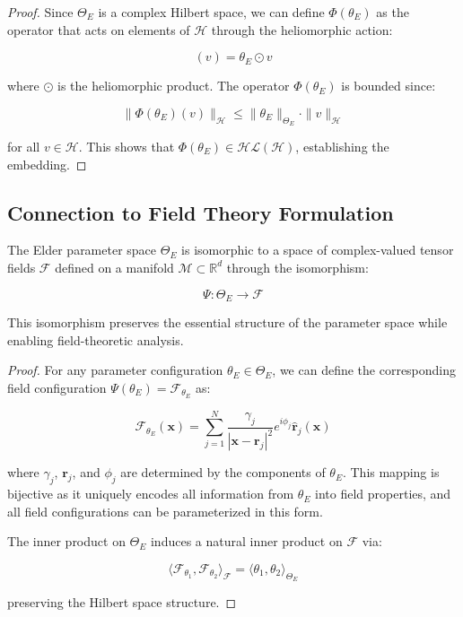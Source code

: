\begin{proof}
Since $\Theta_E$ is a complex Hilbert space, we can define $\Phi(\theta_E)$ as the operator that acts on elements of $\mathcal{H}$ through the heliomorphic action:

\begin{equation}
[\Phi(\theta_E)](v) = \theta_E \odot v
\end{equation}

where $\odot$ is the heliomorphic product. The operator $\Phi(\theta_E)$ is bounded since:

\begin{equation}
\|\Phi(\theta_E)(v)\|_{\mathcal{H}} \leq \|\theta_E\|_{\Theta_E} \cdot \|v\|_{\mathcal{H}}
\end{equation}

for all $v \in \mathcal{H}$. This shows that $\Phi(\theta_E) \in \mathcal{HL}(\mathcal{H})$, establishing the embedding.
\end{proof}

\subsection{Connection to Field Theory Formulation}

\begin{theorem}
The Elder parameter space $\Theta_E$ is isomorphic to a space of complex-valued tensor fields $\mathcal{F}$ defined on a manifold $\mathcal{M} \subset \mathbb{R}^d$ through the isomorphism:

\begin{equation}
\Psi: \Theta_E \to \mathcal{F}
\end{equation}

This isomorphism preserves the essential structure of the parameter space while enabling field-theoretic analysis.
\end{theorem}

\begin{proof}
For any parameter configuration $\theta_E \in \Theta_E$, we can define the corresponding field configuration $\Psi(\theta_E) = \mathcal{F}_{\theta_E}$ as:

\begin{equation}
\mathcal{F}_{\theta_E}(\mathbf{x}) = \sum_{j=1}^N \frac{\gamma_j}{|\mathbf{x} - \mathbf{r}_j|^2} e^{i\phi_j} \hat{\mathbf{r}}_j(\mathbf{x})
\end{equation}

where $\gamma_j$, $\mathbf{r}_j$, and $\phi_j$ are determined by the components of $\theta_E$. This mapping is bijective as it uniquely encodes all information from $\theta_E$ into field properties, and all field configurations can be parameterized in this form.

The inner product on $\Theta_E$ induces a natural inner product on $\mathcal{F}$ via:

\begin{equation}
\langle \mathcal{F}_{\theta_1}, \mathcal{F}_{\theta_2} \rangle_{\mathcal{F}} = \langle \theta_1, \theta_2 \rangle_{\Theta_E}
\end{equation}

preserving the Hilbert space structure.
\end{proof}

